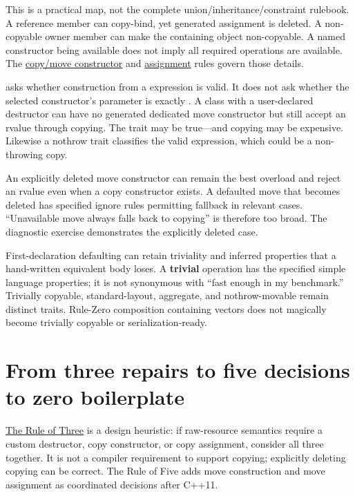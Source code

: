 This is a practical map, not the complete union/inheritance/constraint rulebook. A reference member can copy-bind, yet generated assignment is deleted. A non-copyable owner member can make the containing object non-copyable. A named constructor being available does not imply all required operations are available. The \href{https://eel.is/c++draft/class.copy.ctor}{copy/move constructor} and \href{https://eel.is/c++draft/class.copy.assign}{assignment} rules govern those details.

 asks whether construction from a  expression is valid. It does not ask whether the selected constructor's parameter is exactly . A class with a user-declared destructor can have no generated dedicated move constructor but still accept an rvalue through  copying. The trait may be true---and copying may be expensive. Likewise a nothrow trait classifies the valid expression, which could be a non-throwing copy.

An explicitly deleted move constructor can remain the best overload and reject an rvalue even when a copy constructor exists. A defaulted move that becomes deleted has specified ignore rules permitting fallback in relevant cases. ``Unavailable move always falls back to copying'' is therefore too broad. The diagnostic exercise demonstrates the explicitly deleted case.

First-declaration defaulting can retain triviality and inferred properties that a hand-written equivalent body loses. A \textbf{trivial} operation has the specified simple language properties; it is not synonymous with ``fast enough in my benchmark.'' Trivially copyable, standard-layout, aggregate, and nothrow-movable remain distinct traits. Rule-Zero composition containing vectors does not magically become trivially copyable or serialization-ready.

\section{From three repairs to five decisions to zero boilerplate}\label{01-foundations-i-ch003-from-three-repairs-to-five-decisions-to-zero-boilerplate}

\hypertarget{01-foundations-i-ch003-from-three-repairs-to-five-decisions-to-zero-boilerplate}{}

\hyperref[appendix-7679107d057e]{The Rule of Three} is a design heuristic: if raw-resource semantics require a custom destructor, copy constructor, or copy assignment, consider all three together. It is not a compiler requirement to support copying; explicitly deleting copying can be correct. The Rule of Five adds move construction and move assignment as coordinated decisions after C++11.

